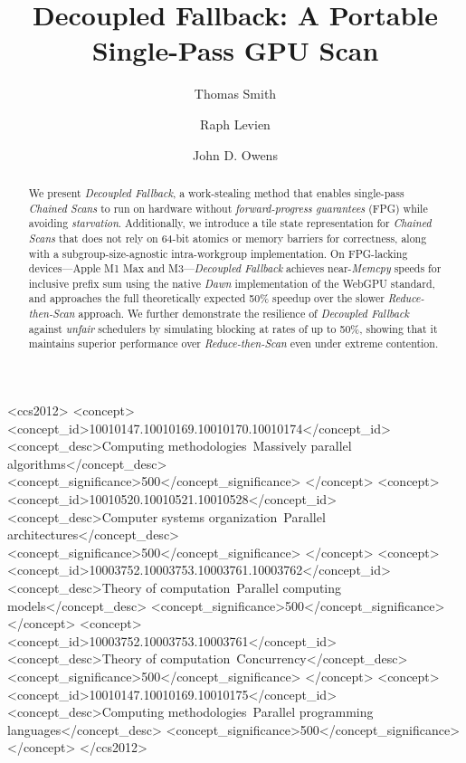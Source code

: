 \documentclass[sigconf,screen]{acmart}
\begin{document}
\title{Decoupled Fallback: A Portable Single-Pass GPU Scan}

\author{Thomas Smith}

\author{Raph Levien}

\author{John D. Owens}

\renewcommand{\shortauthors}{Smith et al.}

\begin{abstract}
  We present \emph{Decoupled Fallback}, a work-stealing method that enables single-pass \emph{Chained Scans} to run on hardware without \emph{forward-progress guarantees} (FPG) while avoiding \emph{starvation}. Additionally, we introduce a tile state representation for \emph{Chained Scans} that does not rely on 64-bit atomics or memory barriers for correctness, along with a subgroup-size-agnostic intra-workgroup implementation. On FPG-lacking devices---Apple M1 Max and M3---\emph{Decoupled Fallback} achieves near-\emph{Memcpy} speeds for inclusive prefix sum using the native \emph{Dawn} implementation of the WebGPU standard, and approaches the full theoretically expected 50\% speedup over the slower \emph{Reduce-then-Scan} approach. We further demonstrate the resilience of \emph{Decoupled Fallback} against \emph{unfair} schedulers by simulating blocking at rates of up to 50\%, showing that it maintains superior performance over \emph{Reduce-then-Scan} even under extreme contention.
\end{abstract}

\begin{CCSXML}
  <ccs2012>
  <concept>
  <concept_id>10010147.10010169.10010170.10010174</concept_id>
  <concept_desc>Computing methodologies~Massively parallel algorithms</concept_desc>
  <concept_significance>500</concept_significance>
  </concept>
  <concept>
  <concept_id>10010520.10010521.10010528</concept_id>
  <concept_desc>Computer systems organization~Parallel architectures</concept_desc>
  <concept_significance>500</concept_significance>
  </concept>
  <concept>
  <concept_id>10003752.10003753.10003761.10003762</concept_id>
  <concept_desc>Theory of computation~Parallel computing models</concept_desc>
  <concept_significance>500</concept_significance>
  </concept>
  <concept>
  <concept_id>10003752.10003753.10003761</concept_id>
  <concept_desc>Theory of computation~Concurrency</concept_desc>
  <concept_significance>500</concept_significance>
  </concept>
  <concept>
  <concept_id>10010147.10010169.10010175</concept_id>
  <concept_desc>Computing methodologies~Parallel programming languages</concept_desc>
  <concept_significance>500</concept_significance>
  </concept>
  </ccs2012>
\end{CCSXML}
\end{document}
